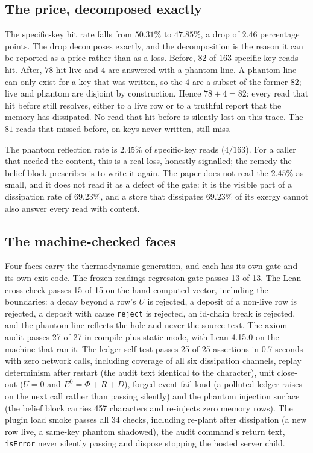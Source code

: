 \documentclass[11pt,a4paper]{article}
\newcommand{\Ezero}{E^{0}}
\begin{document}
\subsection{The price, decomposed exactly}
\label{sec:price}
The specific-key hit rate falls from $50.31\%$ to $47.85\%$, a drop of $2.46$ percentage points. The drop decomposes exactly, and the decomposition is the reason it can be reported as a price rather than as a loss. Before, $82$ of $163$ specific-key reads hit. After, $78$ hit live and $4$ are answered with a phantom line. A phantom line can only exist for a key that was written, so the $4$ are a subset of the former $82$; live and phantom are disjoint by construction. Hence $78 + 4 = 82$: every read that hit before still resolves, either to a live row or to a truthful report that the memory has dissipated. No read that hit before is silently lost on this trace. The $81$ reads that missed before, on keys never written, still miss.

The phantom reflection rate is $2.45\%$ of specific-key reads ($4/163$). For a caller that needed the content, this is a real loss, honestly signalled; the remedy the belief block prescribes is to write it again. The paper does not read the $2.45\%$ as small, and it does not read it as a defect of the gate: it is the visible part of a dissipation rate of $69.23\%$, and a store that dissipates $69.23\%$ of its exergy cannot also answer every read with content.

\subsection{The machine-checked faces}
\label{sec:faces}
Four faces carry the thermodynamic generation, and each has its own gate and its own exit code. The frozen readings regression gate passes 13 of 13. The Lean cross-check passes 15 of 15 on the hand-computed vector, including the boundaries: a decay beyond a row's $U$ is rejected, a deposit of a non-live row is rejected, a deposit with cause \texttt{reject} is rejected, an id-chain break is rejected, and the phantom line reflects the hole and never the source text. The axiom audit passes 27 of 27 in compile-plus-static mode, with Lean 4.15.0 on the machine that ran it. The ledger self-test passes 25 of 25 assertions in 0.7 seconds with zero network calls, including coverage of all six dissipation channels, replay determinism after restart (the audit text identical to the character), unit close-out ($U = 0$ and $\Ezero = \Phi+R+D$), forged-event fail-loud (a polluted ledger raises on the next call rather than passing silently) and the phantom injection surface (the belief block carries 457 characters and re-injects zero memory rows). The plugin load smoke passes all 34 checks, including re-plant after dissipation (a new row live, a same-key phantom shadowed), the audit command's return text, \texttt{isError} never silently passing and dispose stopping the hosted server child.
\end{document}
